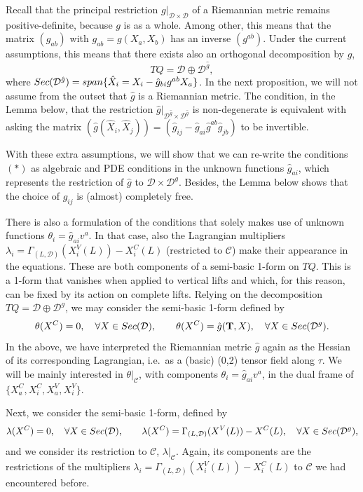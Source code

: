 \documentclass[11pt]{article}
\def\T{{\mathbf T}}
\def\D{{\mathcal D}}
\def\C{{\mathcal C}}
\begin{document}
Recall that the principal restriction $g|_{\D \times \D}$ of a Riemannian metric remains positive-definite, because $g$ is as a whole. Among other, this means that the matrix $(g_{ab})$ with $g_{ab}=g(X_a,X_b)$ has an inverse $(g^{ab})$. Under the current assumptions,  this means that there exists also an orthogonal decomposition by $\hat g$,
\[
TQ = \D \oplus \D^{\hat g},
\]
where ${\rm Sec}(\D^{\hat g}) = {\rm span}\{ {\hat X}_i= X_i - {\hat g}_{bi} g^{ab} X_a \}$. In the next proposition, we will not assume from the outset that $\hat g$ is a Riemannian metric. The condition, in the Lemma below, that the restriction ${\hat g}|_{\D^{\hat g} \times \D^{\hat g}}$ is non-degenerate is equivalent with asking the matrix $({\hat g}({\hat X}_i,{\hat X}_j))=({\hat g}_{ij}-{\hat g}_{ai}{\hat g}^{ab}{\hat g}_{jb})$ to be invertible.


With these extra assumptions, we will show  that we can  re-write the conditions $(*)$ as algebraic and PDE conditions in the unknown functions ${\hat g}_{ai}$, which represents the restriction of $\hat g$ to $\D\times\D^g$. Besides, the Lemma below shows that the choice of ${\hat g}_{ij}$ is (almost) completely free. 

There is also a formulation of the conditions that solely makes use of  unknown functions $\theta_i={\hat g}_{ai}v^a$. In that case, also  the Lagrangian multipliers 
$\lambda_i=\Gamma_{(L,\mathcal{D})}(X_i^V(L))-X_i^C(L)$ (restricted to $\mathcal{C}$) make their appearance in the equations.  These are both components of a semi-basic 1-form on $TQ$. This is a  1-form that vanishes when applied to vertical lifts and which, for this reason, can be fixed by its action on complete lifts. Relying on the decomposition $TQ=\D\oplus\D^g$, we may consider the semi-basic 1-form defined by 
\[
\theta(X^C) = 0, \quad \forall X\in {\rm Sec}(\D), \qquad \theta(X^C)={\hat g}(\T,X) , \quad \forall X\in {\rm Sec}(\D^g).
\]
In the above, we have interpreted the Riemannian metric $\hat g$ again as the Hessian of its corresponding Lagrangian, i.e.\ as a (basic) (0,2) tensor field along $\tau$. We will be mainly interested in $\theta|_\C$, with components $\theta_i={\hat g}_{ai}v^a$, in the dual frame of $\{X_a^C,X_i^C,X_a^V,X_i^V\}$. 

Next, we consider the semi-basic 1-form, defined by 
\[
\lambda(X^C) = 0, \quad \forall X\in {\rm Sec}(\D), \qquad \lambda(X^C) =\Gamma_{(L,\mathcal{D})}(X^V(L))-X^C(L), \quad \forall X\in {\rm Sec}(\D^g), 
\]
and we consider its restriction to $\C$, $\lambda|_\C$. Again, its components are the restrictions of the multipliers
$\lambda_i=\Gamma_{(L,\mathcal{D})}(X_i^V(L))-X_i^C(L)$ to $\mathcal{C}$ we had encountered before.  
\end{document}
